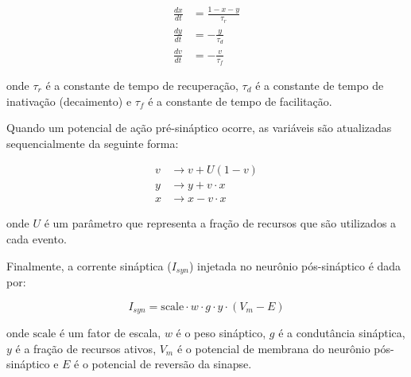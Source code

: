 \begin{align}
    \frac{dx}{dt} &= \frac{1-x-y}{\tau_r} \label{eq:tsodyks_x} \\
    \frac{dy}{dt} &= -\frac{y}{\tau_d} \label{eq:tsodyks_y} \\
    \frac{dv}{dt} &= -\frac{v}{\tau_f} \label{eq:tsodyks_v}
\end{align}

onde $\tau_r$ é a constante de tempo de recuperação, $\tau_d$ é a constante de tempo de inativação (decaimento) e $\tau_f$ é a constante de tempo de facilitação.

Quando um potencial de ação pré-sináptico ocorre, as variáveis são atualizadas sequencialmente da seguinte forma:

\begin{align}
    v &\to v + U (1-v) \label{eq:tsodyks_v_update} \\
    y &\to y + v \cdot x \label{eq:tsodyks_y_update} \\
    x &\to x - v \cdot x \label{eq:tsodyks_x_update}
\end{align}


onde $U$ é um parâmetro que representa a fração de recursos que são utilizados a cada evento.

Finalmente, a corrente sináptica ($I_{syn}$) injetada no neurônio pós-sináptico é dada por:

\begin{equation}
    I_{syn} = \text{scale} \cdot w \cdot g \cdot y \cdot (V_m - E) \label{eq:tsodyks_I}
\end{equation}

onde $\text{scale}$ é um fator de escala, $w$ é o peso sináptico, $g$ é a condutância sináptica, $y$ é a fração de recursos ativos, $V_m$ é o potencial de membrana do neurônio pós-sináptico e $E$ é o potencial de reversão da sinapse.






